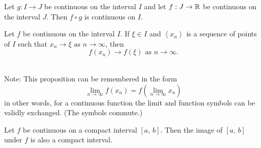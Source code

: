 \documentclass[10pt, a4paper]{article}
\newcommand{\limas}[3][n]{#2 \rightarrow #3 \text{ as } #1 \rightarrow \infty}
\newcommand{\seq}[1][x_n]{\left\langle #1 \right\rangle}
\begin{document}
\begin{proposition}
    Let $g : I \rightarrow J$ be continuous on the interval $I$ and let $f : J \rightarrow \mathbb{R}$ be continuous on the interval $J$. Then $f \circ g$ is continuous on $I$.
\end{proposition}

\begin{proposition}\label{prop_cont_seq_imgconv}
    Let $f$ be continuous on the interval $I$. If $\xi \in I$ and $\seq$ is a sequence of points of $I$ such that $\limas{x_n}{\xi}$, then
    $$\limas{f(x_n)}{f(\xi)}.$$
\end{proposition}
\phantom{} \\
Note: This proposition can be remembered in the form
\[
\lim_{n \rightarrow \infty}{f(x_n)} = f(\lim_{n \rightarrow \infty}{x_n})
\]
in other words, for a continuous function the limit and function symbols can be validly exchanged. (The symbols commute.)

\begin{theorem}
    Let $f$ be continuous on a compact interval $[a,\,b]$. Then the image of $[a,\,b]$ under $f$ is also a compact interval.
\end{theorem}
\end{document}

